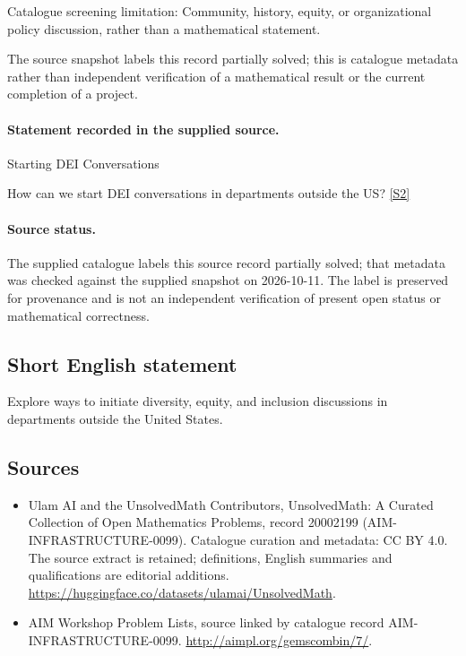 \documentclass[11pt]{article}
\begin{document}
Catalogue screening limitation: Community, history, equity, or organizational policy discussion, rather than a mathematical statement.

The source snapshot labels this record partially solved; this is catalogue metadata rather than independent verification of a mathematical result or the current completion of a project.
\paragraph{Statement recorded in the supplied source.}
Starting DEI Conversations

How can we start DEI conversations in departments outside the US? \href{http://aimpl.org/gemscombin/7/}{[S2]}
\paragraph{Source status.}
The supplied catalogue labels this source record partially solved; that metadata was checked against the supplied snapshot on 2026-10-11. The label is preserved for provenance and is not an independent verification of present open status or mathematical correctness.
\subsection{Short English statement}
Explore ways to initiate diversity, equity, and inclusion discussions in departments outside the United States.
\subsection{Sources}
\begin{itemize}
\item[S1] Ulam AI and the UnsolvedMath Contributors, UnsolvedMath: A Curated Collection of Open Mathematics Problems, record 20002199 (AIM-INFRASTRUCTURE-0099). Catalogue curation and metadata: CC BY 4.0. The source extract is retained; definitions, English summaries and qualifications are editorial additions.
\url{https://huggingface.co/datasets/ulamai/UnsolvedMath}.
\item[S2] AIM Workshop Problem Lists, source linked by catalogue record AIM-INFRASTRUCTURE-0099.
\url{http://aimpl.org/gemscombin/7/}.
\end{itemize}
\end{document}

